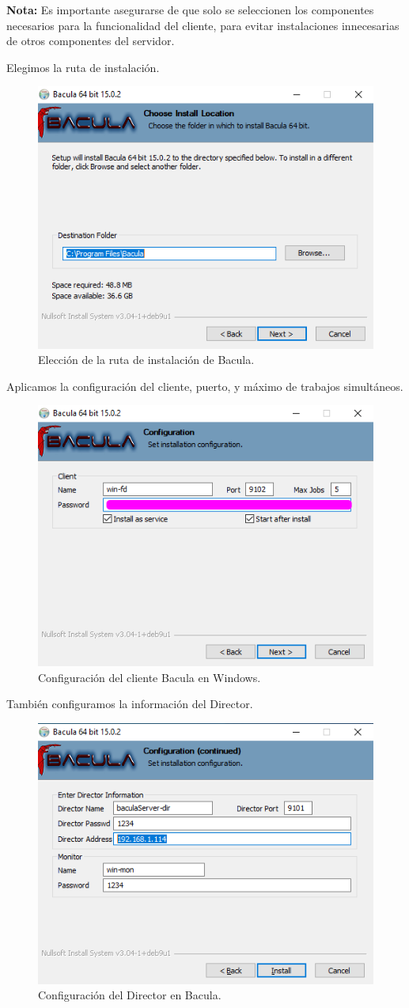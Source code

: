 \textbf{Nota:} Es importante asegurarse de que solo se seleccionen los componentes necesarios para la funcionalidad del cliente, para evitar instalaciones innecesarias de otros componentes del servidor.


Elegimos la ruta de instalación.

\begin{figure}[H]
    \centering
    \includegraphics[width=0.5\linewidth]{instalacionBacula/rutawindebacula.png}
    \caption{Elección de la ruta de instalación de Bacula.}
\end{figure}

Aplicamos la configuración del cliente, puerto, y máximo de trabajos simultáneos.

\begin{figure}[H]
    \centering
    \includegraphics[width=0.5\linewidth]{instalacionBacula/configwinbaCULA.png}
    \caption{Configuración del cliente Bacula en Windows.}
\end{figure}

También configuramos la información del Director.

\begin{figure}[H]
    \centering
    \includegraphics[width=0.5\linewidth]{instalacionBacula/config2winbacula.png}
    \caption{Configuración del Director en Bacula.}
\end{figure}

